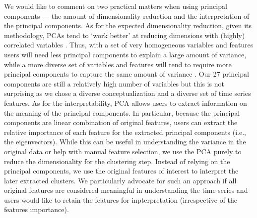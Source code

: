 We would like to comment on two practical matters when using principal
components --- the amount of dimensionality reduction and the
interpretation of the principal components. As for the expected
dimensionality reduction, given its methodology, PCAs tend to `work
better' at reducing dimensions with (highly) correlated variables
\citep[e.g.,][]{jolliffe2002}. Thus, with a set of very homogeneous
variables and features users will need less principal components to
explain a large amount of variance, while a more diverse set of
variables and features will tend to require more principal components to
capture the same amount of variance \citep[e.g.,][]{abdi2010}. Our 27
principal components are still a relatively high number of variables but
this is not surprising as we chose a diverse conceptualization and a
diverse set of time series features. As for the interpretability, PCA
allows users to extract information on the meaning of the principal
components. In particular, because the principal components are linear
combination of original features, users can extract the relative
importance of each feature for the extracted principal components (i.e.,
the eigenvectors). While this can be useful in understanding the
variance in the original data or help with manual feature selection, we
use the PCA purely to reduce the dimensionality for the clustering step.
Instead of relying on the principal components, we use the original
features of interest to interpret the later extracted clusters. We
particularly advocate for such an approach if all original features are
considered meaningful in understanding the time series and users would
like to retain the features for inpterpretation (irrespective of the
features importance).

